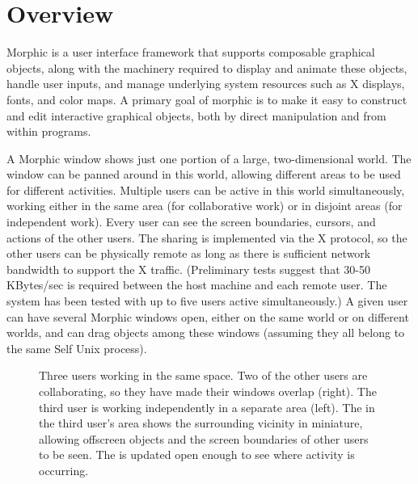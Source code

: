 \documentclass[letterpaper,10pt,english]{sphinxmanual}
\begin{document}
\section{Overview}
\label{\detokenize{morphic:overview}}
Morphic is a user interface framework that supports composable graphical objects, along with the machinery required to display and animate these objects, handle user inputs, and manage underlying system resources such as X displays, fonts, and color maps. A primary goal of morphic is to make it easy to construct and edit interactive graphical objects, both by direct manipulation and from within programs.

A Morphic window shows just one portion of a large, two-dimensional world. The window can be panned around in this world, allowing different areas to be used for different activities. Multiple users can be active in this world simultaneously, working either in the same area (for collaborative work) or in disjoint areas (for independent work). Every user can see the screen boundaries, cursors, and actions of the other users. The sharing is implemented via the X protocol, so the other users can be physically remote as long as there is sufficient network bandwidth to support the X traffic. (Preliminary tests suggest that 30-50 KBytes/sec is required between the host machine and each remote user. The system has been tested with up to five users active simultaneously.) A given user can have several Morphic windows open, either on the same world or on different worlds, and can drag objects among these windows (assuming they all belong to the same Self Unix process).
\begin{figure}[htbp]
\centering
\capstart

\noindent{}
\caption{Three users working in the same space. Two of the other users are collaborating, so they have made their windows overlap (right). The third user is working independently in a separate area (left). The  in the third user's area shows the surrounding vicinity in miniature, allowing offscreen objects and the screen boundaries of other users to be seen. The  is updated open enough to see where activity is occurring.}\label{\detokenize{morphic:id3}}\end{figure}
\end{document}
